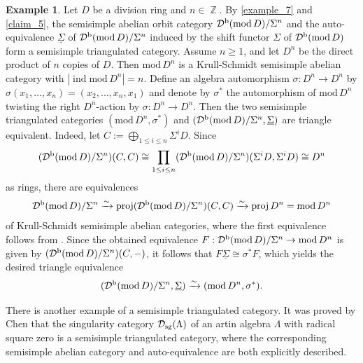 \documentclass[12pt]{amsart}
\numberwithin{equation}{subsection}
\theoremstyle{plain}
\theoremstyle{definition}
\newtheorem{example}[theorem]{Example}
\renewcommand{\mod}{\mathrm{mod}\,}
\newcommand{\proj}{\operatorname{proj}}
\newcommand{\ind}{\operatorname{ind}}
\newcommand{\Z}{\operatorname{\mathbb{Z}}\nolimits}
\renewcommand{\L}{\Lambda}
\newcommand{\D}{\mathcal{D}}
\begin{document}
\begin{example}\label{example_5}
Let $D$ be a division ring and $n\in\Z$.
By \cref{example_7} and \cref{claim_5}, the semisimple abelian orbit category $\D^{\rm b}(\mod D)/\Sigma^n$ and the auto-equivalence $\underline{\Sigma}$ of $\D^{\rm b}(\mod D)/\Sigma^n$ induced by the shift functor $\Sigma$ of $\D^{\rm b}(\mod D)$ form a semisimple triangulated category. 
Assume $n\geq 1$, and let $D^n$ be the direct product of $n$ copies of $D$.
Then $\mod D^n$ is a Krull-Schmidt semisimple abelian category with $|\ind\mod D^n| = n$.
Define an algebra automorphism $\sigma :D^n \to D^n$ by $\sigma(x_1, \ldots, x_n) = (x_2, \ldots, x_n, x_1)$ and denote by $\sigma^*$ the automorphism of $\mod D^n$ twisting the right $D^n$-action by $\sigma :D^n \to D^n$.
Then the two semisimple triangulated categories $(\mod D^n, \sigma^*)$ and $(\D^{\rm b}(\mod D)/\Sigma^n, \underline{\Sigma})$ are triangle equivalent.
Indeed, let $C:=\bigoplus_{1\leq i\leq n}\Sigma^i D$.
Since 
\begin{align}
    (\D^{\rm b}(\mod D)/\Sigma^n)(C, C) \cong \prod_{1\leq i\leq n}(\D^{\rm b}(\mod D)/\Sigma^n)(\Sigma^iD, \Sigma^iD)\cong D^n
\end{align}
as rings, there are equivalences 
\begin{align}
    \D^{\rm b}(\mod D)/\Sigma^n 
    \xrightarrow{\sim} \proj(\D^{\rm b}(\mod D)/\Sigma^n)(C, C)
    \xrightarrow{\sim} \proj D^n =\mod D^n
\end{align}
of Krull-Schmidt semisimple abelian categories, where the first equivalence follows from \cite[Proposition 2.7]{Auslander_1974_I}.
Since the obtained equivalence $F:\D^{\rm b}(\mod D)/\Sigma^n\to \mod D^n$ is given by $(\D^{\rm b}(\mod D)/\Sigma^n)(C, -)$, it follows that $F \underline{\Sigma} \cong \sigma^* F$, which yields the desired triangle equivalence  
\begin{align}
    (\D^{\rm b}(\mod D)/\Sigma^n, \underline{\Sigma}) \xrightarrow{\sim} (\mod D^n, \sigma^*).
\end{align}
\end{example}




There is another example of a semisimple triangulated category.
It was proved by Chen  \cite[Theorem 3.8]{X-WChen_2011} that the singularity category $\D_{\rm sg}(\L)$ of an artin algebra  $\L$ with radical square zero is a semisimple triangulated category, 
where the corresponding semisimple abelian category and auto-equivalence are both explicitly described.
\end{document}
